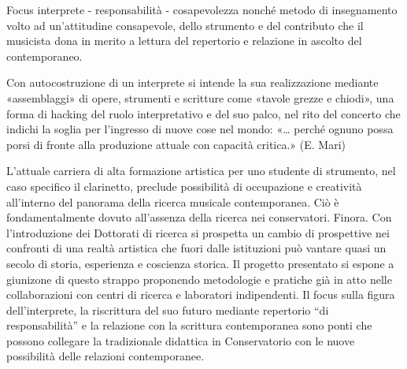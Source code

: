 \documentclass{gs-adonis}
\begin{document}
Focus interprete - responsabilità - cosapevolezza
nonché metodo di insegnamento volto ad un'attitudine consapevole, dello strumento e del
contributo che il musicista dona in merito a lettura del repertorio e relazione in ascolto
del contemporaneo.

Con autocostruzione di un interprete si intende la sua realizzazione mediante
«assemblaggi» di opere, strumenti e scritture come «tavole grezze e chiodi»,
una forma di hacking del ruolo interpretativo e del suo palco, nel rito del concerto che indichi la soglia per l'ingresso di nuove cose nel mondo:
«… perché ognuno possa porsi di fronte alla produzione
attuale con capacità critica.» (E. Mari)


L'attuale carriera di alta formazione artistica per uno studente di strumento,
nel caso specifico il clarinetto, preclude possibilità di occupazione e
creatività all'interno del panorama della ricerca musicale contemporanea. Ciò
è fondamentalmente dovuto all'assenza della ricerca nei conservatori. Finora.
Con l'introduzione dei Dottorati di ricerca si prospetta un cambio di
prospettive nei confronti di una realtà artistica che fuori dalle istituzioni
può vantare quasi un secolo di storia, esperienza e coscienza storica. Il
progetto presentato si espone a giunizone di questo strappo proponendo
metodologie e pratiche già in atto nelle collaborazioni con centri di ricerca e
laboratori indipendenti. Il focus sulla figura dell'interprete, la riscrittura
del suo futuro mediante repertorio “di responsabilità” e la relazione con
la scrittura contemporanea sono ponti che possono collegare la tradizionale
didattica in Conservatorio con le nuove possibilità delle relazioni
contemporanee.

\clearpage
\raggedright
\nocite{*}
%
\printbibliography
\end{document}
